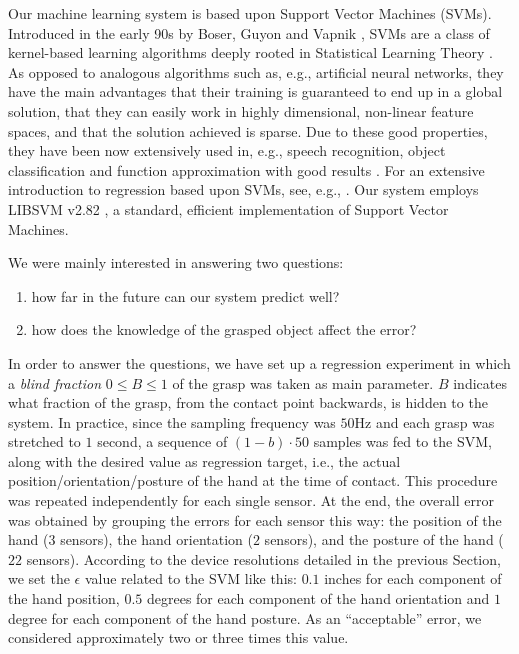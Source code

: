 Our machine learning system is based upon Support Vector Machines
(SVMs). Introduced in the early 90s by Boser, Guyon and Vapnik
\cite{BGV92}, SVMs are a class of kernel-based learning algorithms
deeply rooted in Statistical Learning Theory \cite{v-edbed-82}. As
opposed to analogous algorithms such as, e.g., artificial neural
networks, they have the main advantages that their training is
guaranteed to end up in a global solution, that they can easily work
in highly dimensional, non-linear feature spaces, and that the
solution achieved is sparse. Due to these good properties, they have
been now extensively used in, e.g., speech recognition, object
classification and function approximation with good results
\cite{Cristianini00}. For an extensive introduction to regression
based upon SVMs, see, e.g., \cite{SmolaTut2004}. Our system employs
LIBSVM v2.82 \cite{ChangL01}, a standard, efficient implementation of
Support Vector Machines.

We were mainly interested in answering two questions:

\begin{enumerate}

  \item how far in the future can our system predict well?

  \item how does the knowledge of the grasped object affect the error?

\end{enumerate}

In order to answer the questions, we have set up a regression
experiment in which a \emph{blind fraction} $0 \leq B \leq 1$ of the
grasp was taken as main parameter. $B$ indicates what fraction of the
grasp, from the contact point backwards, is hidden to the system. In
practice, since the sampling frequency was $50$Hz and each grasp was
stretched to $1$ second, a sequence of $(1-b) \cdot 50$ samples was
fed to the SVM, along with the desired value as regression target,
i.e., the actual position/orientation/posture of the hand at the time
of contact. This procedure was repeated independently for each single
sensor. At the end, the overall error was obtained by grouping the
errors for each sensor this way: the position of the hand ($3$
sensors), the hand orientation ($2$ sensors), and the posture of the
hand ($22$ sensors). According to the device resolutions detailed in
the previous Section, we set the $\epsilon$ value related to the SVM
\cite{SmolaTut2004} like this: $0.1$ inches for each component of the
hand position, $0.5$ degrees for each component of the hand
orientation and $1$ degree for each component of the hand posture. As
an ``acceptable'' error, we considered approximately two or three
times this value.

